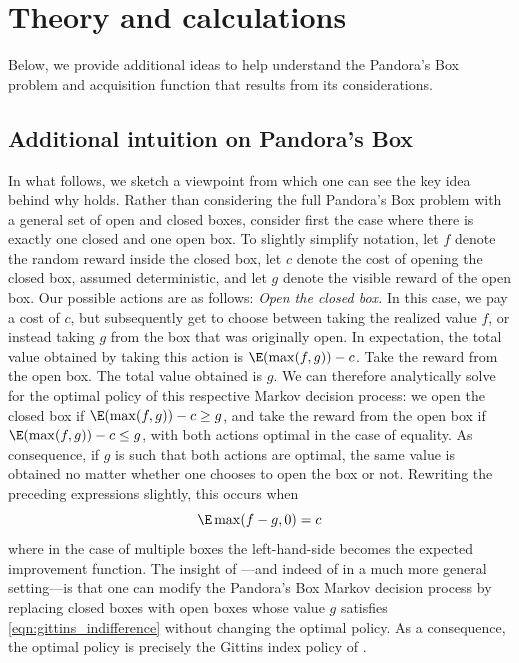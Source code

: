 \documentclass{article}
\begin{document}
\section{Theory and calculations}
\label{apdx:theory}

Below, we provide additional ideas to help understand the Pandora's Box problem and acquisition function that results from its considerations.

\subsection{Additional intuition on Pandora's Box}
\label{apdx:theory:intuition}

In what follows, we sketch a viewpoint from which one can see the key idea behind why  holds.
Rather than considering the full Pandora's Box problem with a general set of open and closed boxes, consider first the case where there is exactly one closed and one open box.
To slightly simplify notation, let $f$ denote the random reward inside the closed box, let $c$ denote the cost of opening the closed box, assumed deterministic, and let $g$ denote the visible reward of the open box.
Our possible actions are as follows:
\1 \emph{Open the closed box.} In this case, we pay a cost of $c$, but subsequently get to choose between taking the realized value $f$, or instead taking $g$ from the box that was originally open. In expectation, the total value obtained by taking this action is $\E(\max(f,g)) - c$.
\2 Take the reward from the open box. The total value obtained is $g$.
\0 
We can therefore analytically solve for the optimal policy of this respective Markov decision process: we open the closed box if $\E(\max(f,g)) - c \geq g$, and take the reward from the open box if $\E(\max(f,g)) - c \leq g$, with both actions optimal in the case of equality.
As consequence, if $g$ is such that both actions are optimal, the same value is obtained no matter whether one chooses to open the box or not.
Rewriting the preceding expressions slightly, this occurs when 
\[
\label{eqn:gittins_indifference}
\E\max(f-g,0) = c
\]
where in the case of multiple boxes the left-hand-side becomes the expected improvement function.
The insight of \textcite{weitzman1979optimal}---and indeed of \textcite{gittins79} in a much more general setting---is that one can modify the Pandora's Box Markov decision process by replacing closed boxes with open boxes whose value $g$ satisfies \eqref{eqn:gittins_indifference} without changing the optimal policy.
As a consequence, the optimal policy is precisely the Gittins index policy of .
\end{document}
